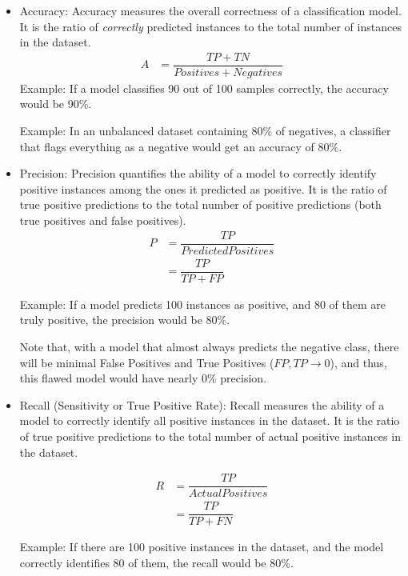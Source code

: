 \begin{itemize}
    \item Accuracy: Accuracy measures the overall correctness of a classification model. It is the ratio of \emph{correctly} predicted instances to the total number of instances in the dataset.\\
    \begin{align}
    A &= \dfrac{TP + TN}{Positives + Negatives}  \label{eq:def_accuarcy}
\end{align}
    Example: If a model classifies 90 out of 100 samples correctly, the accuracy would be 90\%.

    Example: In an unbalanced dataset containing 80\% of negatives, a classifier that flags everything as a negative would get an accuracy of 80\%.
    
    \item Precision: Precision quantifies the ability of a model to correctly identify positive instances among the ones it predicted as positive. It is the ratio of true positive predictions to the total number of positive predictions (both true positives and false positives).
    \begin{align}
    P &= \dfrac{TP}{Predicted Positives} \\
        &=\dfrac{TP}{TP + FP}  \label{eq:def_precision}
    \end{align}
    
    Example: If a model predicts 100 instances as positive, and 80 of them are truly positive, the precision would be 80\%. 
    
    Note that, with a model that almost always predicts the negative class, there will be minimal False Positives and True Positives ($FP, TP \to 0$), and thus, this flawed model would have nearly 0\% precision.

    \item Recall (Sensitivity or True Positive Rate): Recall measures the ability of a model to correctly identify all positive instances in the dataset. It is the ratio of true positive predictions to the total number of actual positive instances in the dataset. 

    \begin{align}
    R   &= \dfrac{TP}{Actual Positives} \\
        &= \dfrac{TP}{TP + FN} \label{eq:def_recall}
    \end{align}

    Example: If there are 100 positive instances in the dataset, and the model correctly identifies 80 of them, the recall would be 80\%.


\end{itemize}
